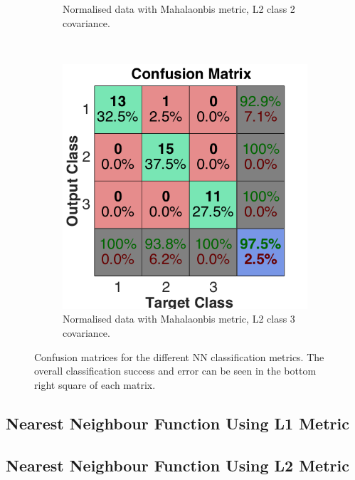 \documentclass[a4paper, 10pt, conference]{ieeeconf}
\begin{document}
\begin{figure}[!ht]
\begin{subfigure}{0.32\textwidth}
      \caption{Normalised data with Mahalaonbis metric, L2 class 2 covariance.}
    \end{subfigure}
    ~
    \begin{subfigure}{0.32\textwidth}
      \includegraphics[width=\textwidth]{pic/mod_cov_l2_class3.png}
      \caption{Normalised data with Mahalaonbis metric, L2 class 3 covariance.}
    \end{subfigure}
	\caption{Confusion matrices for the different NN classification metrics. The overall classification success and error can be seen in the bottom right square of each matrix. }
  \label{fig:nnconfusemod}
\end{figure}
\newpage

\subsection*{Nearest Neighbour Function Using L1 Metric}


\subsection*{Nearest Neighbour Function Using L2 Metric}

\newpage
\end{document}
